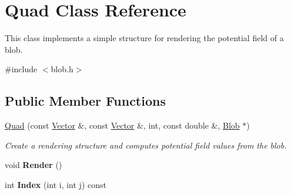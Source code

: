 \hypertarget{class_quad}{
\section{Quad Class Reference}
\label{class_quad}
}


This class implements a simple structure for rendering the potential field of a blob.  




{\ttfamily \#include $<$blob.h$>$}

\subsection*{Public Member Functions}
\begin{DoxyCompactItemize}
\item 
\hypertarget{class_quad_aa081ebb051087aaec7097ea2411c5936}{
\hyperlink{class_quad_aa081ebb051087aaec7097ea2411c5936}{Quad} (const \hyperlink{class_vector}{Vector} \&, const \hyperlink{class_vector}{Vector} \&, int, const double \&, \hyperlink{class_blob}{Blob} $\ast$)}
\label{class_quad_aa081ebb051087aaec7097ea2411c5936}

\begin{DoxyCompactList}\small\item\em Create a rendering structure and computes potential field values from the blob. \item\end{DoxyCompactList}\item 
\hypertarget{class_quad_a0b89ff83b7991466b72ef70b53e2b47f}{
void {\bfseries Render} ()}
\label{class_quad_a0b89ff83b7991466b72ef70b53e2b47f}

\item 
\hypertarget{class_quad_aff2267d6ff7ab85f47c3d4bb30586db0}{
int {\bfseries Index} (int i, int j) const }
\label{class_quad_aff2267d6ff7ab85f47c3d4bb30586db0}

\end{DoxyCompactItemize}
